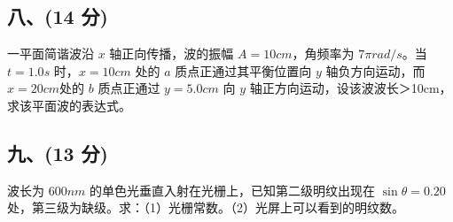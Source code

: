 \subsection{八、(14 分)}
一平面简谐波沿 $x$ 轴正向传播，波的振幅 $A=10cm$，角频率为 $7\pi rad/s$。当
$t=1.0s$ 时，$x=10cm$ 处的 $a$ 质点正通过其平衡位置向 $y$ 轴负方向运动，而 $x=20cm$处的 $b$ 质点正通过 $y=5.0cm$ 向 $y$ 轴正方向运动，设该波波长＞10cm，求该平面波的表达式。
\subsection{九、(13 分)}
波长为 $600nm$ 的单色光垂直入射在光栅上，已知第二级明纹出现在 $\sin \theta=0.20$ 处，第三级为缺级。求：（1）光栅常数。（2）光屏上可以看到的明纹数。